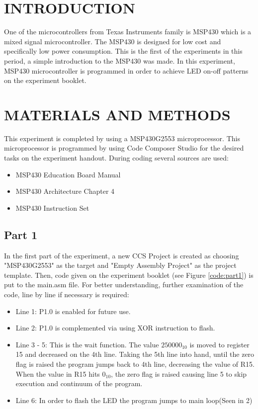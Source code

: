 \documentclass[pdftex,12pt,a4paper]{article}
\begin{document}
\section{INTRODUCTION}
One of the microcontrollers from Texas Instruments family is MSP430 which is a mixed signal microcontroller. The MSP430 is designed for low cost and specifically low power consumption. This is the first of the experiments in this period, a simple introduction to the MSP430 was made. In this experiment, MSP430 microcontroller is programmed in order to achieve LED on-off patterns on the experiment booklet. 

\section{MATERIALS AND METHODS}

This experiment is completed by using a MSP430G2553 microprocessor. This microprocessor is programmed by using Code Composer Studio for the desired tasks on the experiment handout. During coding several sources are used:

\begin{itemize}
    \item MSP430 Education Board Manual \cite{ref2}
    \item MSP430 Architecture Chapter 4 \cite{ref3}
    \item MSP430 Instruction Set \cite{ref4}
\end{itemize}

\subsection{Part 1}
 
\newline{}
In the first part of the experiment, a new CCS Project is created as choosing "MSP430G2553" as the target and "Empty Assembly Project" as the project template. Then, code given on the experiment booklet \cite{booklet}(see Figure \ref{code:part1}) is put to the main.asm file.
For better understanding, further examination of the code, line by line if necessary is required:

\begin{itemize}
    \item Line 1: P1.0 is enabled for future use.
    \item Line 2: P1.0 is complemented via using XOR instruction to flash.
    \item Line 3 - 5: This is the wait function. The value $250000_{10}$ is moved to register 15 and decreased on the 4th line. Taking the 5th line into hand, until the zero flag is raised the program jumps back to 4th line, decreasing the value of R15. When the value in R15 hits $0_{10}$, the zero flag is raised causing line 5 to skip execution and continuum of the program.
    \item Line 6: In order to flash the LED the program jumps to main loop(Seen in 2)
\end{itemize}
\end{document}

